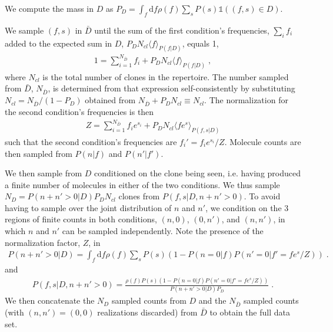 \documentclass[letterpaper,english,prl,reprint,onecolumn]{revtex4-1} %
\begin{document}
We compute the mass in $D$ as $P_D=\int_f \textrm{d}f\rho(f)\sum_s P(s) \mathbb{1}((f,s)\in D)$.

We sample $(f,s)$ in $\bar D$ until the sum of the first condition's frequencies, $\sum_i f_i$ added to the expected sum in $D$, $P_D N_{cl}\langle f\rangle_{P(f|D)}$, equals 1,
\begin{align}
	1=\sum_{i=1}^{N_{\bar D}} f_i + P_D N_{cl}\langle f\rangle_{P(f|D)}\;,
\end{align}
where $N_{cl}$ is the total number of clones in the repertoire. The number sampled from $\bar D$, $N_{\bar D}$, is determined from that expression self-consistently by substituting $N_{cl}=N_{\bar D}/(1-P_D)$ obtained from $N_{\bar D}+P_D N_{cl}\equiv N_{cl}$. The normalization for the second condition's frequencies is then 
\begin{align}
	Z=\sum_{i=1}^{N_{\bar D}} f_ie^{s_i} + P_D N_{cl}\langle fe^s\rangle_{P(f,s|D)}
\end{align}
such that the second condition's frequencies are ${f_i'=f_ie^{s_i}/Z}$. Molecule counts are then sampled from $P(n|f)$ and $P(n'|f')$.  

We then sample from $D$ conditioned on the clone being seen, i.e. having produced a finite number of molecules in either of the two conditions. We thus sample $N_D=P(n+n'>0|D)P_D N_{cl}$ clones from $P(f,s|D,n+n'>0)$. To avoid having to sample over the joint distribution of $n$ and $n'$, we condition on the 3 regions of finite counts in both conditions, $(n,0)$, $(0,n')$, and $(n,n')$, in which $n$ and $n'$ can be sampled independently. 
Note the presence of the normalization factor, $Z$, in 
\begin{align}
	P(n+n'>0|D)=\int_f \textrm{d}f\rho(f)\sum_s P(s)(1-P(n=0|f)P(n'=0|f'=fe^s/Z))\;.
\end{align}
and
\begin{align}
	P(f,s|D,n+n'>0)=\frac{\rho(f)P(s)(1-P(n=0|f)P(n'=0|f'=fe^s/Z))}{P(n+n'>0|D)P_D}\;.
\end{align}
We then concatenate the $N_D$ sampled counts from $D$ and the $N_{\bar D}$ sampled counts (with $(n,n')=(0,0)$ realizations discarded) from $\bar D$ to obtain the full data set.  
\end{document}
